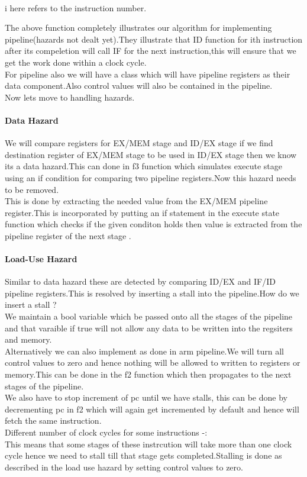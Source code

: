 \documentclass[12pt]{extarticle}
\begin{document}
\\
i here refers to the instruction number.


The above function completely illustrates our algorithm for implementing pipeline(hazards not dealt yet).They illustrate that ID function for ith instruction after its compeletion will call IF for the next instruction,this will ensure that we get the work done within a clock cycle.
\\
For pipeline also we will have a class which will have pipeline registers as their data component.Also control values will also be contained in the pipeline.
\\
Now lets move to handling hazards.\\
\paragraph{Data Hazard}
We will compare registers for EX/MEM stage and ID/EX stage if we find destination register of EX/MEM stage to be used in ID/EX stage then we know its a data hazard.This can done in f3 function which simulates execute stage using an if condition for comparing two pipeline registers.Now this hazard needs to be removed.\\
													This is done by extracting the needed value from the 
EX/MEM pipeline register.This is incorporated by putting an if statement in the execute state function which checks if the given conditon holds then value is extracted from the pipeline register of the next stage .

\paragraph{Load-Use Hazard}
Similar to data hazard these are detected by comparing ID/EX and IF/ID pipeline registers.This is resolved by inserting a stall into the pipeline.How do we insert a stall ?\\
We maintain a bool variable which be passed onto all the stages of the pipeline and that varaible if true will not allow any data to be written into the regsiters and memory.\\
Alternatively we can also implement as done in arm pipeline.We will turn all control values to zero and hence nothing will be allowed to written to registers or memory.This can be done in the f2 function which then propagates to the next stages of the pipeline.\\
															We also have to stop increment of pc until we have stalls, this can be done by decrementing pc in f2 which will again get incremented by default and hence will fetch the same instruction.\\
Different number of clock cycles for some instructions -:\\
This means that some stages of these instrcution will take more than one clock cycle hence we need to stall till that stage gets completed.Stalling is done as described in the load use hazard by setting control values to zero.

\end{document}
